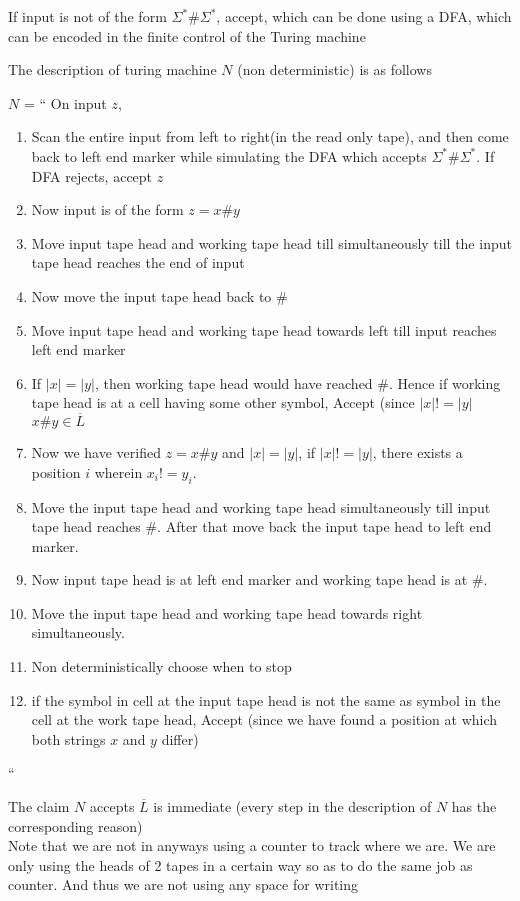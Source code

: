 If input is not of the form $\Sigma^* \# \Sigma^*$, accept, which can be done using a DFA, which can be encoded in the finite control of the Turing machine

The description of turing machine $N$ (non deterministic) is as follows 

$N$ = 
``
On input $z$,
\begin{enumerate}
    \item Scan the entire input from left to right(in the read only tape), and then come back to left end marker while simulating the DFA which accepts $\Sigma^* \# \Sigma^*$. If DFA rejects, accept $z$
    \item Now input is of the form $z = x\#y$
    \item Move input tape head and working tape head till simultaneously till the input tape head reaches the end of input
    \item Now move the input tape head back to \#
    \item Move input tape head and working tape head towards left till input reaches left end marker
    \item If $|x| = |y|$, then working tape head would have reached \#. Hence if working tape head is at a cell having some other symbol, Accept (since $|x| != |y|$ \imp $x\#y \in \overline{L}$
    \item Now we have verified $z = x\#y$ and $|x| = |y|$, if $|x| != |y|$, there exists a position $i$ wherein $x_i != y_i$.
    \item Move the input tape head and working tape head simultaneously till input tape head reaches \#. After that move back the input tape head to left end marker.
    \item Now input tape head is at left end marker and working tape head is at \#. 
    \item Move the input tape head and working tape head towards right simultaneously.
    \item Non deterministically choose when to stop
    \item if the symbol in cell at the input tape head is not the same as symbol in the cell at the work tape head, Accept (since we have found a position at which both strings $x$ and $y$ differ)
\end{enumerate}

``

The claim $N$ accepts $\overline{L}$ is immediate (every step in the description of $N$ has the corresponding reason)\\
Note that we are not in anyways using a counter to track where we are. We are only using the heads of 2 tapes in a certain way so as to do the same job as counter. And thus we are not using any space for writing




















